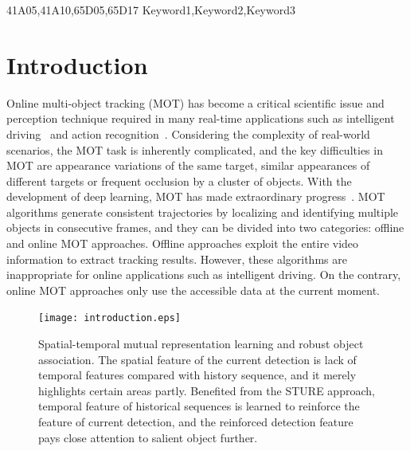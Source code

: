 \documentclass[times,twocolumn,final,authoryear]{elsarticle}
\begin{document}
\begin{frontmatter}
\begin{keyword}
\MSC 41A05\sep 41A10\sep 65D05\sep 65D17
\KWD Keyword1\sep Keyword2\sep Keyword3

\end{keyword}

\end{frontmatter}


\section{Introduction}
\label{sec1}
Online multi-object tracking (MOT) has become a critical scientific issue and perception technique required in many real-time applications such as intelligent driving~\citep{geiger2012are} and action recognition~\citep{RN583}. 
Considering the complexity of real-world scenarios, the MOT task is inherently complicated, and the key difficulties in MOT are appearance variations of the same target, similar appearances of different targets or frequent occlusion by a cluster of {objects}. 
With the development of deep learning, MOT has made extraordinary progress~\citep{RN550,wen2020ua-detrac}. 
MOT algorithms generate consistent trajectories by localizing and identifying multiple {objects} in consecutive frames, and they can be divided into two categories: offline and online MOT approaches. 
Offline approaches exploit the entire video information to extract tracking results. 
However, these algorithms are {inappropriate} for online applications such as intelligent driving. 
On the contrary, online MOT approaches only use the accessible data at the current moment.


\begin{figure}[!ht]
	\centering
	\texttt{[image: introduction.eps]}
	\caption{Spatial-temporal mutual representation learning and robust object association. 
		The spatial feature of the current detection is lack of temporal features {compared with} history sequence,
		and it merely highlights certain areas partly.
		Benefited from the STURE approach, temporal feature of historical sequences is learned to reinforce the feature of current detection,
		and the reinforced detection feature pays close attention to salient object further.}
	\label{fig:introduction}
\end{figure}
\end{document}
